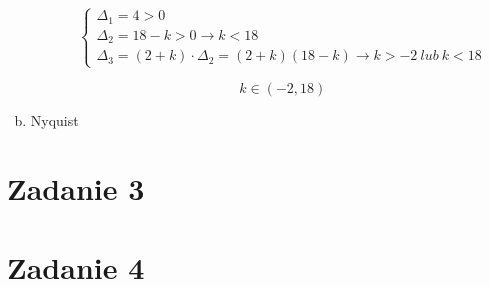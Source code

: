 \documentclass{article}
\begin{document}
\begin{enumerate}[a)]
\begin{enumerate}[a)]
        \[\begin{cases}
            \Delta_{1}=4>0
            \\
            \Delta_{2}=18-k>0 \rightarrow k<18
            \\
            \Delta_{3}=\left(2+k\right)\cdot \Delta_{2}=\left(2+k\right) \left(18-k\right) \rightarrow k>-2 \ lub \ k<18
        \end{cases}\]
        
        $$k \in \left(-2, 18\right)$$
    \end{enumerate}

    \newpage

    
    \item Nyquist
\end{enumerate}
    
    \section*{Zadanie 3}
    
    
    
    \section*{Zadanie 4}
    
    
    
    
\end{document}
